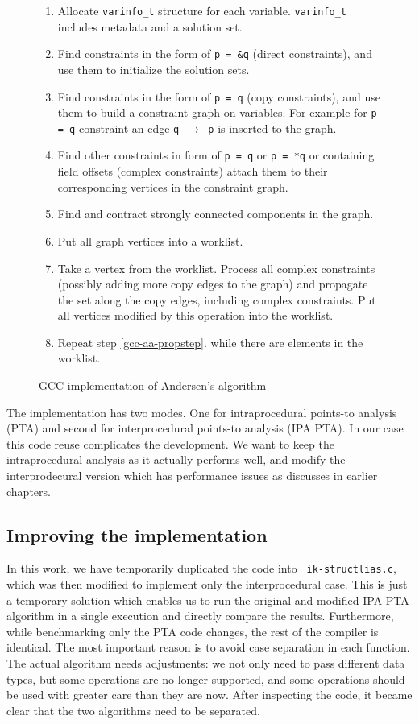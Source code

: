 \begin{figure}[!ht]
\begin{tcolorbox}
\begin{enumerate}
	\item Allocate {\tt varinfo\_t} structure for each variable. {\tt varinfo\_t} includes
		metadata and a solution set.
	\item Find constraints in the form of {\tt p = \&q} (direct constraints), and
		use them to initialize the solution sets.
	\item Find constraints in the form of {\tt p = q} (copy constraints), and use
		them to build a constraint graph on variables. For example for {\tt p =
		q} constraint an edge {\tt q $\to$ p} is inserted to the graph.
	\item Find other constraints in form of {\tt *p = q} or {\tt p = *q} or
		containing field offsets (complex constraints) attach them to their
		corresponding vertices in the constraint graph.
	\item Find and contract strongly connected components in the graph.
	\item Put all graph vertices into a worklist.
	\item Take a vertex from the worklist. Process all complex constraints
		(possibly adding more copy edges to the graph) and propagate the set
		along the copy edges, including complex constraints. Put all vertices
		modified by this operation into the worklist.
	\label{gcc-aa-propstep}
	\item Repeat step \ref{gcc-aa-propstep}. while there are elements in the worklist.
\end{enumerate}
\end{tcolorbox}
\caption{GCC implementation of Andersen's algorithm}
\label{figure-gcc-aliasalg}
\end{figure}

The implementation has two modes. One for intraprocedural points-to analysis
(PTA) and second for interprocedural points-to analysis (IPA PTA). In our case
this code reuse complicates the development. We want to keep the
intraprocedural analysis as it actually performs well, and modify the
interprodecural version which has performance issues as discusses in earlier
chapters.

\subsection{Improving the implementation}

In this work, we have temporarily duplicated the code into {\tt
ik-structlias.c}, which was then modified to implement only the interprocedural
case. This is just a temporary solution which enables us to run the original
and modified IPA PTA algorithm in a single execution and directly compare the
results. Furthermore, while benchmarking only the PTA code changes, the rest of
the compiler is identical.  The most important reason is to avoid case
separation in each function. The actual algorithm needs adjustments: we not
only need to pass different data types, but some operations are no longer
supported, and some operations should be used with greater care than they are
now. After inspecting the code, it became clear that the two algorithms need to
be separated.

